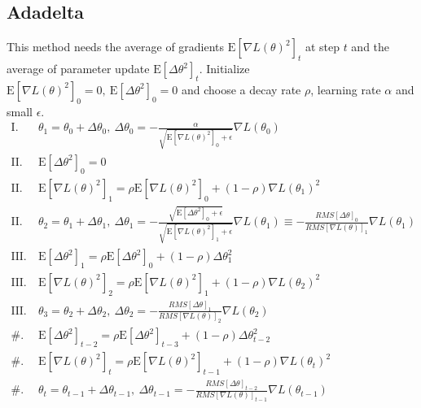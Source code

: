 \documentclass[../main.tex]{subfiles}
\begin{document}
        \subsection{Adadelta}
            This method needs the average of gradients $\mathrm{E}[\nabla L(\theta)^2]_t$ at step $t$ and the average of parameter update $\mathrm{E}[\Delta \theta^2]_t$. Initialize $\mathrm{E}[\nabla L(\theta)^2]_0 = 0,~\mathrm{E}[\Delta \theta^2]_0 = 0$ and choose a decay rate $\rho$, learning rate $\alpha$ and small $\epsilon$.
            \begin{align*}
                \mathrm{I}.~& \theta_1 = \theta_0 + \Delta \theta_0,~ \Delta \theta_0 = - \frac{\alpha}{ \sqrt{ \mathrm{E}[\nabla L(\theta)^2]_0 + \epsilon} }\nabla L(\theta_0) \\[0.3cm]
                \mathrm{II}.~& \mathrm{E}[\Delta \theta^2]_0 = 0\\
                \mathrm{II}.~& \mathrm{E}[\nabla L(\theta)^2]_1 = \rho \mathrm{E}[\nabla L(\theta)^2]_0 + (1 - \rho) \nabla L(\theta_1)^2\\
                \mathrm{II}.~& \theta_2 = \theta_1 + \Delta \theta_1,~ \Delta \theta_1 = - \frac{ \sqrt{ \mathrm{E}[\Delta \theta^2]_0 + \epsilon} }{ \sqrt{\mathrm{E}[\nabla L(\theta)^2]_1 + \epsilon} }\nabla L(\theta_1) \equiv - \frac{RMS[\Delta \theta]_0}{RMS[\nabla L(\theta)]_1}\nabla L(\theta_1) \\[0.3cm]
                \mathrm{III}.~& \mathrm{E}[\Delta \theta^2]_1 = \rho \mathrm{E}[\Delta \theta^2]_0 + (1-\rho) \Delta\theta_1^2 \\
                \mathrm{III}.~& \mathrm{E}[\nabla L(\theta)^2]_2 = \rho \mathrm{E}[\nabla L(\theta)^2]_1 + (1 - \rho) \nabla L(\theta_2)^2 \\
                \mathrm{III}.~& \theta_3 = \theta_2 + \Delta \theta_2,~ \Delta \theta_2 = - \frac{RMS[\Delta \theta]_1}{RMS[\nabla L(\theta)]_2}\nabla L(\theta_2)\\[0.3cm]
                \mathrm{\#}.~& \mathrm{E}[\Delta \theta^2]_{t-2} = \rho \mathrm{E}[\Delta \theta^2]_{t-3} + (1-\rho) \Delta\theta_{t-2}^2\\
                \mathrm{\#}.~& \mathrm{E}[\nabla L(\theta)^2]_t = \rho \mathrm{E}[\nabla L(\theta)^2]_{t-1} + (1 - \rho) \nabla L(\theta_t)^2\\
                \mathrm{\#}.~& \theta_t = \theta_{t-1} + \Delta \theta_{t-1},~\Delta \theta_{t-1} = - \frac{RMS[\Delta \theta]_{t-2}}{RMS[\nabla L(\theta)]_{t-1}}\nabla L(\theta_{t-1})
            \end{align*}
\end{document}
